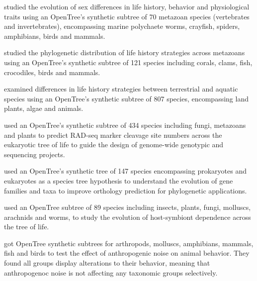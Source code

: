 \documentclass[oupdraft]{sysbio_sse}
\begin{document}
\citep{tarka2018sex} studied the evolution of sex differences in life history, behavior
and physiological traits using an OpenTree's synthetic subtree of 70 metazoan species (vertebrates and invertebrates),
encompassing marine polychaete worms, crayfish, spiders, amphibians, birds and mammals.

\citep{healy2019animal} studied the phylogenetic distribution of life history strategies across metazoans
using an OpenTree's synthetic subtree of 121 species including corals, clams,
fish, crocodiles, birds and mammals.

\citep{capdevila2020longevity} examined differences in life history strategies between
terrestrial and aquatic species using an OpenTree's synthetic subtree of 807 species,
encompassing land plants, algae and animals.

\citep{herrera2015predicting} used an OpenTree's synthetic subtree of 434 species
including fungi, metazoans and plants to predict RAD-seq marker cleavage site numbers
across the eukaryotic tree of life to guide the design of genome-wide genotypic and
sequencing projects.

\citep{boeckmann2015quest} used an OpenTree's synthetic tree of 147 species encompassing
prokaryotes and eukaryotes as a species tree hypothesis to understand the evolution
of gene families and taxa to improve orthology prediction for phylogenetic applications.


\citep{fisher2017evolution} used an OpenTree subtree of 89 species including insects, plants,
fungi, molluscs, arachnids and worms, to study the evolution of host-symbiont
dependence across the tree of life.

\citep{kunc2019effects} got OpenTree synthetic subtrees for arthropods, molluscs,
amphibians, mammals, fish and birds to test the effect of anthropogenic noise on
animal behavior. They found all groups display alterations to their behavior, meaning
that anthropogenoc noise is not affecting any taxonomic groups selectively.
\end{document}
